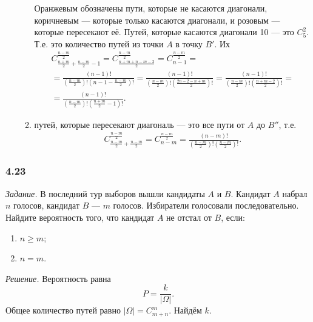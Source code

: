 \begin{enumerate}[label=\alph*)]
\begin{enumerate}[label=(\roman*)]
Оранжевым обозначены пути, которые не касаются диагонали, коричневым --- которые только касаются диагонали, и розовым --- которые пересекают её.
Путей, которые касаются диагонали 10 --- это $C_5^2$.
Т.е. это количество путей из точки $A$ в точку $B'$.
Их
\begin{equation*}
\begin{split}
C_{ \frac{n+m}{2} + \frac{n-m}{2} - 1}^{ \frac{n-m}{2} } =
C_{ \frac{n+m+n-m-2}{2} }^{ \frac{n-m}{2} } =
C_{n-1}^{ \frac{n-m}{2} } = \\
= \frac{ \left( n-1 \right)!}{ \left( \frac{n-m}{2} \right)! \left( n - 1 - \frac{n-m}{2} \right)!} =
\frac{ \left( n-1 \right)!}{ \left( \frac{n-m}{2} \right)! \left( \frac{2n-2-n+m}{2} \right)!} =
\frac{ \left( n-1 \right)!}{ \left( \frac{n-m}{2} \right)! \left( \frac{n+m-2}{2} \right)!} = \\
= \frac{ \left( n-1 \right)!}{ \left( \frac{n-m}{2} \right)! \left( \frac{n+m}{2} - 1 \right)!}.
\end{split}
\end{equation*}

\item путей, которые пересекают диагональ --- это все пути от $A$ до $B''$, т.е.
\begin{equation*}
\begin{split}
C_{ \frac{n-m}{2} + \frac{n-m}{2} }^{ \frac{n-m}{2} } =
C_{n-m}^{ \frac{n-m}{2} } =
\frac{ \left( n-m \right)!}{ \left( \frac{n-m}{2} \right)! \left( \frac{n-m}{2} \right)! }.
\end{split}
\end{equation*}
\end{enumerate}
\end{enumerate}

\subsubsection*{4.23}

\textit{Задание.} В последний тур выборов вышли кандидаты $A$ и $B$.
Кандидат $A$ набрал $n$ голосов, кандидат $B$ --- $m$ голосов.
Избиратели голосовали последовательно.
Найдите вероятность того, что кандидат $A$ не отстал от $B$, если:
\begin{enumerate}[label=\alph*)]
\item $n \geq m$;
\item $n = m$.
\end{enumerate}
 
\textit{Решение.} Вероятность равна
$$P =
\frac{k}{| \Omega |}.$$
Общее количество путей равно $| \Omega| = C_{m+n}^m$.
Найдём $k$.

